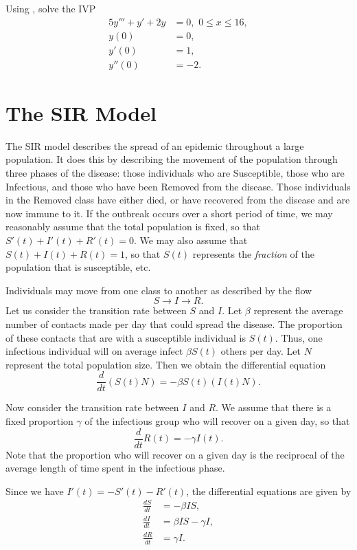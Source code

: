 \begin{problem}
Using , solve the IVP
\begin{align*}
5y''' + y'+2y &= 0, \,\, 0 \leq x \leq 16,\\
y(0) &=0,\\
y'(0) &= 1,\\
y''(0) &= -2.
\end{align*}
\end{problem}

\section*{The SIR Model}
The SIR model describes the spread of an epidemic throughout a large population. It does this by describing the movement of the population through three phases of the disease: those individuals who are Susceptible, those who are Infectious, and those who have been Removed from the disease. Those individuals in the Removed class have either died, or have recovered from the disease and are now immune to it. If the outbreak occurs over a short period of time, we may reasonably assume that the total population is fixed, so that $S'(t) + I'(t) + R'(t) = 0$.  We may also assume that $S(t) + I(t) + R(t) = 1$, so that $S(t)$ represents the \textit{fraction} of the population that is susceptible, etc. 

Individuals may move from one class to another as described by the flow 
\[S \to I \to R.\] Let us consider the transition rate between $S$ and $I $. Let $\beta$ represent the average number of contacts made per day that could spread the disease. The proportion of these contacts that are with a susceptible individual is $S(t)$. Thus, one infectious individual will on average infect $\beta S(t)$ others per day. Let $N$ represent the total population size. Then we obtain the differential equation
 \[\frac{d}{dt}(S(t) N) = -\beta S(t) (I(t) N).\]
 
 Now consider the transition rate between $I$ and $R$. We assume that there is a fixed proportion $\gamma$ of the infectious group who will recover on a given day, so that 
 \[\frac{d}{dt}R(t) = -\gamma I(t).\]
 Note that the proportion who will recover on a given day is the reciprocal of the average length of time spent in the infectious phase. 
 
 Since we have $I'(t) = - S'(t) - R'(t)$, the  differential equations are given by
\begin{align*}
\frac{dS}{dt} &=-\beta IS ,\\
\frac{dI}{dt} &= \beta I S-\gamma I, \\
\frac{dR}{dt} &=\gamma I.
\end{align*}



